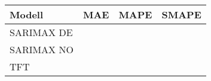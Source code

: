 \begin{tabularx}{\textwidth}{|X|X|X|X|}
    \hline
    Modell & MAE & MAPE & SMAPE \\ \hline \hline
    SARIMAX DE & & & \\ \hline
    SARIMAX NO & & & \\ \hline
    TFT & & & \\ \hline
\end{tabularx}

